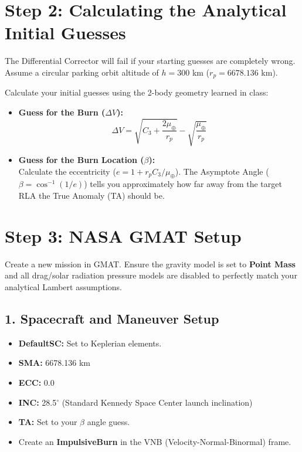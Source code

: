 \documentclass[12pt]{article}
\begin{document}
\section*{Step 2: Calculating the Analytical Initial Guesses}
The Differential Corrector will fail if your starting guesses are completely wrong. Assume a circular parking orbit altitude of $h = 300$ km ($r_p = 6678.136$ km). 

Calculate your initial guesses using the 2-body geometry learned in class:
\begin{itemize}
    \item \textbf{Guess for the Burn ($\Delta V$):}
    \begin{equation*}
        \Delta V = \sqrt{C_3 + \frac{2\mu_\oplus}{r_p}} - \sqrt{\frac{\mu_\oplus}{r_p}}
    \end{equation*}
    \item \textbf{Guess for the Burn Location ($\beta$):} \\
    Calculate the eccentricity ($e = 1 + r_p C_3 / \mu_\oplus$). The Asymptote Angle ($\beta = \cos^{-1}(1/e)$) tells you approximately how far away from the target RLA the True Anomaly (TA) should be.
\end{itemize}

\newpage

\section*{Step 3: NASA GMAT Setup}
Create a new mission in GMAT. Ensure the gravity model is set to \textbf{Point Mass} and all drag/solar radiation pressure models are disabled to perfectly match your analytical Lambert assumptions.

\subsection*{1. Spacecraft and Maneuver Setup}
\begin{itemize}
    \item \textbf{DefaultSC:} Set to Keplerian elements.
    \item \textbf{SMA:} 6678.136 km
    \item \textbf{ECC:} 0.0
    \item \textbf{INC:} 28.5$^\circ$ (Standard Kennedy Space Center launch inclination)
    \item \textbf{TA:} Set to your $\beta$ angle guess.
    \item Create an \textbf{ImpulsiveBurn} in the VNB (Velocity-Normal-Binormal) frame.
\end{itemize}
\end{document}
